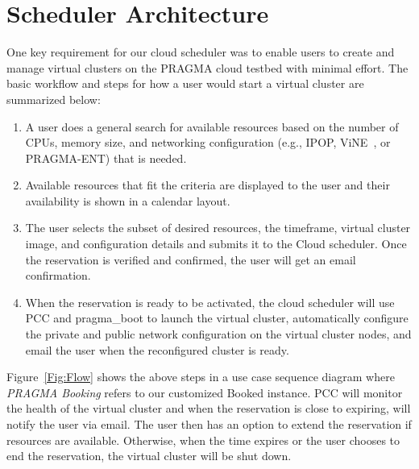 \documentclass[times]{cpeauth}
\begin{document}
\section{Scheduler Architecture}
\label{Sec:Arch}

One key requirement for our cloud scheduler was to enable users to create and manage virtual clusters on the PRAGMA cloud testbed with minimal effort. 
The basic workflow and steps for how a user would start a virtual cluster are summarized below:

\begin{enumerate}
\item A user does a general search for available resources based on the number of CPUs, memory size, and networking configuration (e.g., IPOP, ViNE~\cite{vine}, or PRAGMA-ENT) that is needed.  
\item Available resources that fit the criteria are displayed to the user and their availability is shown in a calendar layout.  
\item The user selects the subset of  desired resources, the timeframe, virtual cluster image, and configuration details and submits it to the Cloud scheduler.  Once the reservation is verified and confirmed, the user will get an email confirmation.  
\item When the reservation is ready to be activated, the cloud scheduler will use PCC and pragma\_boot to launch the virtual cluster, automatically configure the private and public network configuration on the virtual cluster nodes, and email the user when the reconfigured cluster is ready.   
\end{enumerate}

Figure~\ref{Fig:Flow} shows the above steps in a use case sequence diagram where \textit{PRAGMA Booking} refers to our customized Booked instance.  PCC will monitor the health of the virtual cluster and when the reservation is close to expiring, will notify the user via email. The user then has an option to extend the reservation if resources are available.  Otherwise, when the time expires or the user chooses to end the reservation, the virtual cluster will be shut down.
\end{document}
